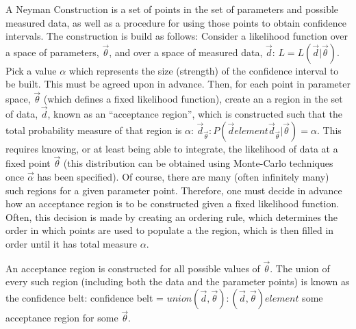 
A Neyman Construction is a set of points in the set of parameters and possible measured data, as well as a procedure for using those points to obtain confidence intervals.
The construction is build as follows:
Consider a likelihood function over a space of parameters, $\vec{\theta}$, and over a space of measured data, $\vec{d}$: $L = L(\vec{d} | \vec{\theta} )$.
Pick a value $\alpha$ which represents the size (strength) of the confidence interval to be built.  This must be agreed upon in advance.
Then, for each point in parameter space, $\vec{ \theta }$ (which defines a fixed likelihood function), create an a region in the set of data, ${ \vec{d} }$, known as an ``acceptance region'', which is constructed such that the total probability measure of that region is $\alpha$: ${ \vec{d}_{ \vec{ \theta } } : P( \vec{d} element \vec{d}_{ \vec{ \theta } } | \vec{ \theta } ) = \alpha }$.
This requires knowing, or at least being able to integrate, the likelihood of data at a fixed point $\vec{\theta}$ (this distribution can be obtained using Monte-Carlo techniques once $\vec{\alpha}$ has been specified).
Of course, there are many (often infinitely many) such regions for a given parameter point.
Therefore, one must decide in advance how an acceptance region is to be constructed given a fixed likelihood function.
Often, this decision is made by creating an ordering rule, which determines the order in which points are used to populate a the region, which is then filled in order until it has total measure $\alpha$.

An acceptance region is constructed for all possible values of $\vec{\theta}$.
The union of every such region (including both the data and the parameter points) is known as the confidence belt: confidence belt = $ union ( \vec{d}, \vec{ \theta }) : ( \vec{d}, \vec{ \theta }) element $ some acceptance region for some $\vec{ \theta } $.

